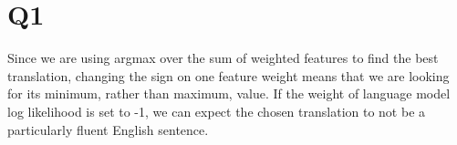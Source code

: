 \section*{Q1}


Since we are using argmax over the sum of weighted features to find the best translation, changing the sign on one feature weight means that we are looking for its minimum, rather than maximum, value. If the weight of language model log likelihood is set to -1, we can expect the chosen translation to not be a particularly fluent English sentence.